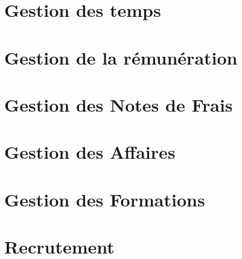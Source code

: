 \documentclass[12pt]{scrreprt}
\begin{document}
\chapter{Gestion des temps}



\chapter{Gestion de la rémunération}

\chapter{Gestion des Notes de Frais}


\chapter{Gestion des Affaires}


\chapter{Gestion des Formations}


\chapter{Recrutement}

% 
\end{document}
